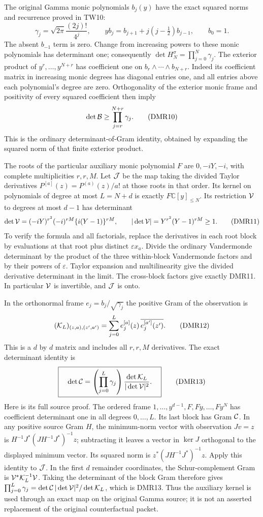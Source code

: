 The original Gamma monic polynomials $b_j(y)$ have the exact
squared norms and recurrence proved in TW10:
\[
 \gamma_j=\sqrt{2\pi}\frac{(2j)!}{4^j},\qquad
 yb_j=b_{j+1}+j(j-\tfrac12)b_{j-1},\qquad b_0=1.
 \tag{DMR9}
\]
The absent $b_{-1}$ term is zero. Change from increasing powers to
these monic polynomials has determinant one; consequently
$\det H_N^\sigma=\prod_{j=0}^N\gamma_j$.
The exterior product of $y^r,\ldots,y^{N+r}$ has coefficient one
on $b_r\wedge\cdots\wedge b_{N+r}$. Indeed its coefficient matrix
in increasing monic degrees has diagonal entries one, and all
entries above each polynomial's degree are zero. Orthogonality
of the exterior monic frame and positivity of every squared
coefficient then imply
\[
 \det{\cal B}\geq\prod_{j=r}^{N+r}\gamma_j .
 \tag{DMR10}
\]
This is the ordinary determinant-of-Gram identity, obtained by
expanding the squared norm of that finite exterior product.

The roots of the particular auxiliary monic polynomial $F$ are
$0,-iY,-i$, with complete multiplicities $r,r,M$. Let $ {\cal J}$
be the map taking the divided Taylor derivatives
$P^{[a]}(z)=P^{(a)}(z)/a!$ at those roots in that order. Its kernel
on polynomials of degree at most $L=N+d$ is exactly
$F\mathbb C[y]_{\leq N}$. Its restriction $ {\cal V}$ to degrees
at most $d-1$ has determinant
\[
 \det{\cal V}=
  (-iY)^{r^2}(-i)^{rM}\{i(Y-1)\}^{rM},\qquad
 |\det{\cal V}|=Y^{r^2}(Y-1)^{rM}\geq1.
 \tag{DMR11}
\]
To verify the formula and all factorials, replace the derivatives
in each root block by evaluations at that root plus distinct
$\varepsilon x_a$. Divide the ordinary Vandermonde determinant
by the product of the three within-block Vandermonde factors
and by their powers of $\varepsilon$. Taylor expansion and
multilinearity give the divided derivative determinant in the
limit. The cross-block factors give exactly DMR11. In particular
$ {\cal V}$ is invertible, and $ {\cal J}$ is onto.

In the orthonormal frame $e_j=b_j/\sqrt{\gamma_j}$ the positive
Gram of the observation is
\[
 ({\cal K}_L)_{(z,a),(z',a')}=
       \sum_{j=0}^L e_j^{[a]}(z)\,
                       \overline{e_j^{[a']}(z')}.
 \tag{DMR12}
\]
This is a $d$ by $d$ matrix and includes all $r,r,M$ derivatives.
The exact determinant identity is
\[
 \boxed{\quad
 \det{\cal C}=
       \left(\prod_{j=0}^L\gamma_j\right)
          \frac{\det{\cal K}_L}{|\det{\cal V}|^2}.
 \quad}\tag{DMR13}
\]
Here is its full source proof. The ordered frame
$1,\ldots,y^{d-1},F,Fy,\ldots,Fy^N$ has coefficient determinant
one in all degrees $0,\ldots,L$. Its last block has Gram
$ {\cal C}$. In any positive source Gram $H$, the minimum-norm
vector with observation $Jv=z$ is
$H^{-1}J^*(JH^{-1}J^*)^{-1}z$; subtracting it leaves a vector
in $\ker J$ orthogonal to the displayed minimum vector.
Its squared norm is $z^*(JH^{-1}J^*)^{-1}z$.
Apply this identity to $ {\cal J}$. In the first $d$ remainder
coordinates, the Schur-complement Gram is
$ {\cal V}^*{\cal K}_L^{-1}{\cal V}$.
Taking the determinant of the block Gram therefore gives
$\prod_{j=0}^L\gamma_j=\det{\cal C}\,
|\det{\cal V}|^2/\det{\cal K}_L$, which is DMR13.
Thus the auxiliary kernel is used through an exact map on the
original Gamma source; it is not an asserted replacement of
the original counterfactual packet.

